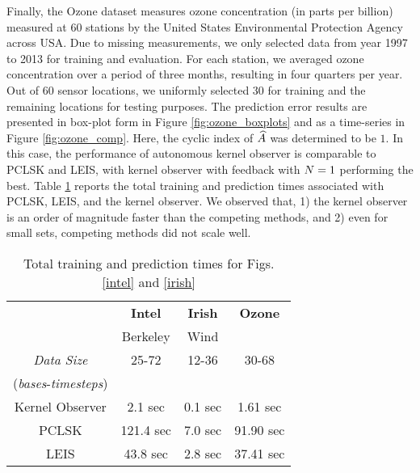 Finally, the Ozone dataset measures ozone concentration (in parts per billion) measured at 60 stations by the United States Environmental Protection Agency \cite{li2006spatiotemporal} across USA. Due to missing measurements, we only selected data from
year 1997 to 2013 for training and evaluation. For each station, we averaged ozone concentration over a period of three months, resulting in four quarters per year.
Out of 60 sensor locations, we uniformly selected 30 for training and the remaining locations for testing purposes. The prediction error results are presented in box-plot form in Figure \ref{fig:ozone_boxplots} and as a time-series in Figure \ref{fig:ozone_comp}. Here, the cyclic index of $\widehat{A}$ was determined to be $1$. In this case, the performance of autonomous kernel observer is comparable to PCLSK and LEIS, with kernel observer with feedback with $N = 1$ performing the best. Table \ref{tab:timing} reports the total training and prediction times associated with PCLSK, LEIS, and the kernel observer. We observed that, 1) the kernel observer is an order of magnitude faster than the competing methods, and 2) even for small sets, competing methods did not scale well.

\begin{table}[h]
	\centering
	\caption{Total training and prediction times for Figs. \ref{intel} and \ref{irish} } \label{tab:timing}
		\begin{tabular}{c|ccc}
		\toprule
			{\bf }  & {\bf Intel } & {\bf Irish } &  {\bf Ozone}  \\
			& Berkeley & Wind & \\
			\midrule
			\emph{Data Size}        & 25-72 & 12-36  & {30-68} \\ 
		    (\emph{bases}-\emph{timesteps})                 &       & & \\ \hline
			Kernel Observer         & 2.1 sec & 0.1 sec & 1.61 sec \\
			PCLSK             & 121.4 sec & 7.0 sec & 91.90 sec \\
			LEIS             & 43.8 sec & 2.8 sec & 37.41 sec\\
		\bottomrule
		\end{tabular}
\end{table}
\vspace{-0.1in}
